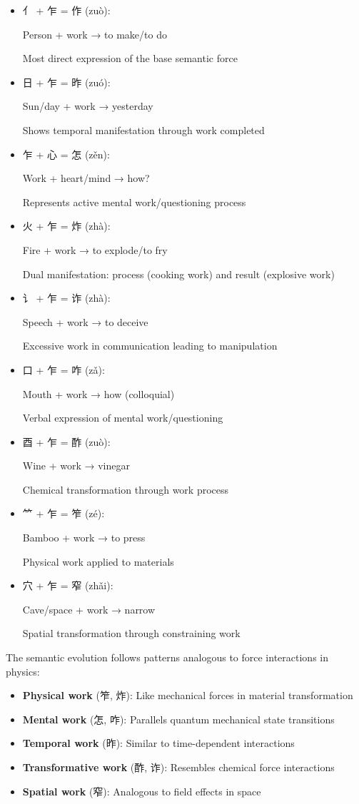 \documentclass[
  11pt,
  letterpaper,
]{article}
\providecommand{\tightlist}{%
  \setlength{\itemsep}{0pt}\setlength{\parskip}{0pt}}
\begin{document}
\begin{itemize}
\item
  亻 + 乍 = 作 (zuò):

  Person + work → to make/to do

  Most direct expression of the base semantic force
\item
  日 + 乍 = 昨 (zuó):

  Sun/day + work → yesterday

  Shows temporal manifestation through work completed
\item
  乍 + 心 = 怎 (zěn):

  Work + heart/mind → how?

  Represents active mental work/questioning process
\item
  火 + 乍 = 炸 (zhà):

  Fire + work → to explode/to fry

  Dual manifestation: process (cooking work) and result (explosive work)
\item
  讠 + 乍 = 诈 (zhà):

  Speech + work → to deceive

  Excessive work in communication leading to manipulation
\item
  口 + 乍 = 咋 (zǎ):

  Mouth + work → how (colloquial)

  Verbal expression of mental work/questioning
\item
  酉 + 乍 = 酢 (zuò):

  Wine + work → vinegar

  Chemical transformation through work process
\item
  ⺮ + 乍 = 笮 (zé):

  Bamboo + work → to press

  Physical work applied to materials
\item
  穴 + 乍 = 窄 (zhǎi):

  Cave/space + work → narrow

  Spatial transformation through constraining work
\end{itemize}

The semantic evolution follows patterns analogous to force interactions
in physics:

\begin{itemize}
\tightlist
\item
  \textbf{Physical work} (笮, 炸): Like mechanical forces in material
  transformation
\item
  \textbf{Mental work} (怎, 咋): Parallels quantum mechanical state
  transitions
\item
  \textbf{Temporal work} (昨): Similar to time-dependent interactions
\item
  \textbf{Transformative work} (酢, 诈): Resembles chemical force
  interactions
\item
  \textbf{Spatial work} (窄): Analogous to field effects in space
\end{itemize}
\end{document}
